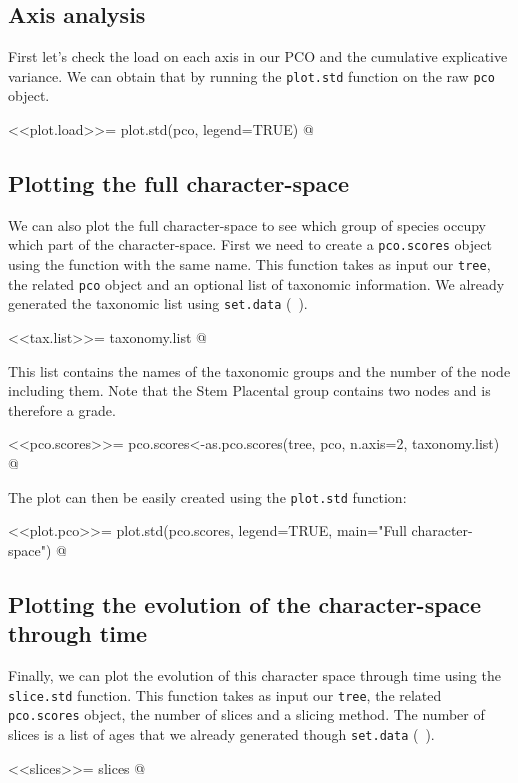 \documentclass[a4paper,11pt]{article}
\begin{document}
\subsection{Axis analysis}
First let's check the load on each axis in our PCO and the cumulative explicative variance.
We can obtain that by running the \texttt{plot.std} function on the raw \texttt{pco} object.

<<plot.load>>=
plot.std(pco, legend=TRUE)
@

\subsection{Plotting the full character-space}
We can also plot the full character-space to see which group of species occupy which part of the character-space.
First we need to create a \texttt{pco.scores} object using the function with the same name.
This function takes as input our \texttt{tree}, the related \texttt{pco} object and an optional list of taxonomic information.
We already generated the taxonomic list using \texttt{set.data} (~\label{data}).

<<tax.list>>=
taxonomy.list
@

This list contains the names of the taxonomic groups and the number of the node including them.
Note that the Stem Placental group contains two nodes and is therefore a grade.

<<pco.scores>>=
pco.scores<-as.pco.scores(tree, pco, n.axis=2, taxonomy.list)
@

The plot can then be easily created using the \texttt{plot.std} function:

<<plot.pco>>=
plot.std(pco.scores, legend=TRUE, main="Full character-space")
@

\subsection{Plotting the evolution of the character-space through time}
Finally, we can plot the evolution of this character space through time using the \texttt{slice.std} function.
This function takes as input our \texttt{tree}, the related \texttt{pco.scores} object, the number of slices and a slicing method.
The number of slices is a list of ages that we already generated though \texttt{set.data} (~\label{data}).

<<slices>>=
slices
@
\end{document}
